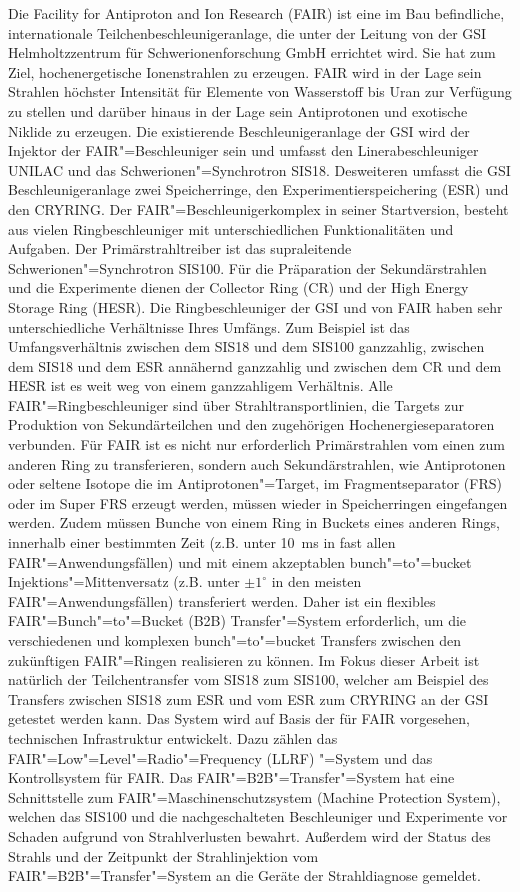 Die Facility for Antiproton and Ion Research (FAIR) ist eine im Bau befindliche, internationale Teilchenbeschleunigeranlage, die unter der Leitung von der GSI Helmholtzzentrum f\"ur Schwerionenforschung GmbH errichtet wird. Sie hat zum Ziel, hochenergetische
Ionenstrahlen zu erzeugen. FAIR wird in der Lage sein Strahlen h\"ochster Intensit\"at für Elemente von Wasserstoff bis Uran zur Verf\"ugung zu stellen und darüber hinaus in der Lage sein Antiprotonen und exotische Niklide zu erzeugen. Die existierende Beschleunigeranlage der GSI wird der Injektor der FAIR"=Beschleuniger sein und umfasst den Linerabeschleuniger UNILAC und das Schwerionen"=Synchrotron SIS18. Desweiteren umfasst die GSI Beschleunigeranlage zwei Speicherringe, den Experimentierspeichering (ESR) und den CRYRING. Der FAIR"=Beschleunigerkomplex in seiner Startversion, besteht aus vielen Ringbeschleuniger mit unterschiedlichen Funktionalit\"aten und Aufgaben. Der Prim\"arstrahltreiber ist das supraleitende Schwerionen"=Synchrotron SIS100. F\"ur die Pr\"aparation der Sekund\"arstrahlen und die Experimente dienen der Collector Ring (CR) und der High Energy Storage Ring (HESR). Die Ringbeschleuniger der GSI und von FAIR haben sehr unterschiedliche Verh\"altnisse Ihres Umf\"angs. Zum Beispiel ist das Umfangsverh\"altnis zwischen dem SIS18 und dem SIS100 ganzzahlig, zwischen dem SIS18 und dem ESR ann\"ahernd ganzzahlig und zwischen dem CR und dem HESR ist es weit weg von einem ganzzahligem Verh\"altnis. Alle FAIR"=Ringbeschleuniger sind \"uber Strahltransportlinien, die Targets zur Produktion von Sekund\"arteilchen und den zugeh\"origen Hochenergieseparatoren verbunden. F\"ur FAIR ist es nicht nur erforderlich Prim\"arstrahlen vom einen zum anderen Ring zu transferieren, sondern auch Sekund\"arstrahlen, wie Antiprotonen oder seltene Isotope die im Antiprotonen"=Target, im Fragmentseparator (FRS) oder im Super FRS erzeugt werden, m\"ussen wieder in Speicherringen eingefangen werden. Zudem m\"ussen Bunche von einem Ring in Buckets eines anderen Rings, innerhalb einer bestimmten Zeit (z.B. unter \SI{10}{\ms} in fast allen FAIR"=Anwendungsf\"allen) und mit einem akzeptablen bunch"=to"=bucket Injektions"=Mittenversatz (z.B. unter $\pm1^\circ$ in den meisten FAIR"=Anwendungsf\"allen) transferiert werden. Daher ist ein flexibles FAIR"=Bunch"=to"=Bucket (B2B) Transfer"=System erforderlich, um die verschiedenen und komplexen bunch"=to"=bucket Transfers zwischen den zuk\"unftigen FAIR"=Ringen realisieren zu k\"onnen. Im Fokus dieser Arbeit ist nat\"urlich der Teilchentransfer vom SIS18 zum SIS100, welcher am Beispiel des Transfers zwischen SIS18 zum ESR und vom ESR zum CRYRING an der GSI getestet werden kann. Das System wird auf Basis der f\"ur FAIR vorgesehen, technischen Infrastruktur entwickelt. Dazu z\"ahlen das FAIR"=Low"=Level"=Radio"=Frequency (LLRF) "=System und das Kontrollsystem f\"ur FAIR. Das FAIR"=B2B"=Transfer"=System hat eine Schnittstelle zum FAIR"=Maschinenschutzsystem (Machine Protection System), welchen das SIS100 und die nachgeschalteten Beschleuniger und Experimente vor Schaden aufgrund von Strahlverlusten bewahrt. Au\ss{}erdem wird der Status des Strahls und der Zeitpunkt der Strahlinjektion vom FAIR"=B2B"=Transfer"=System an die Ger\"ate der Strahldiagnose gemeldet.

